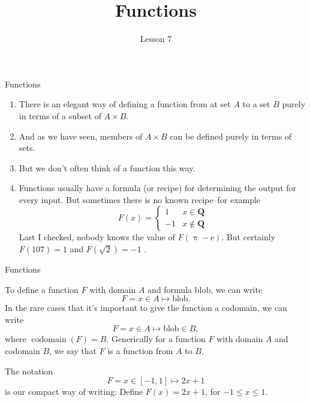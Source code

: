 \documentclass[fleqn]{beamer}
\subtitle{Lesson 7}
\title{\textbf{Functions}}
\date{}
\newcommand{\rationals}{\mathbf{Q}}
\DeclareMathOperator{\codomain}{codomain}
\theoremstyle{definition}
\newenvironment{checklist}{
  \begin{enumerate}[\ding{51}]
    \addtolength{\itemsep}{-0.0\itemsep}}
  {\end{enumerate}}
\begin{document}
\frame{\titlepage}


\begin{frame}{Functions}

\begin{checklist}

\item There is an elegant way of defining a function from at set \(A\) to a set \(B\)  purely in terms of a subset of \(A \times B\).

\vspace{0.2in}

\item And as we have seen, members of \(A \times B\) can be defined purely in terms of sets.

\vspace{0.2in}

\item But we don't often think of a function this way.

\vspace{0.2in}

\item Functions usually have a formula (or recipe) for determining the output for every input. But sometimes there is no known recipe--for example
\[
    F(x) = \begin{cases}   1   & x \in \rationals \\   -1   & x \notin \rationals  \end{cases}
 \]
 Last I checked, nobody knows the value of \(F(\uppi - \mathrm{e}) \).    But certainly \(F(107) = 1 \) and  \(F(\sqrt{2}) = -1 \) .
     

\end{checklist}

\end{frame}

\begin{frame}{Functions}

To define a function \(F\) with domain \(A\) and formula \(\mbox{blob}\), we can write
\[
  F = x \in A \mapsto \mbox{blob}.
\]
In the rare cases that it's important to give the function a codomain, we can write
\[
  F = x \in A \mapsto \mbox{blob} \in B,
\]
where \(\codomain(F) = B\). Generically for a function \(F\) with domain \(A\) and codomain \(B\),  we say that \(F\) is a function from \(A\) to \(B\).

\begin{example} The notation
\[
   F = x \in [-1,1] \mapsto 2 x + 1
\]
is our compact way of writing: Define \(F(x) = 2x + 1 \), for \( -1 \leq x \leq 1\).
\end{example}
\end{frame}
\end{document}
